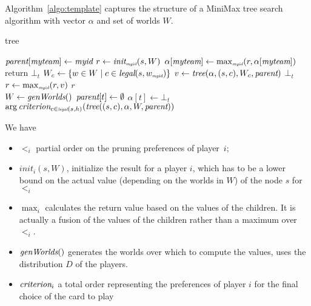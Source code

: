 \documentclass[runningheads]{llncs}
\begin{document}
Algorithm~\ref{algo:template} captures the structure of a MiniMax tree search algorithm with vector $\alpha$ and set of worlds $W$.  
%
\begin{algorithm}[t]
\caption{tree}
\label{algo:template}
\begin{algorithmic}

    \State $\mbox{\em parent}[\mbox{\em myteam}] \gets \mbox{\em myid}$
    \State $r \gets \mbox{\em init}_{\mbox{\em \tiny myid}}(s, W)$
        \State $\alpha[\mbox{\em myteam}] \gets \max_{\mbox{\em \tiny myid}}(r,\alpha[\mbox{\em myteam}])$
            \State $\text{return } \bot_{t}$
        \EndIf
        \State $W_c \gets \{ w \in W \mid c \in \mbox{\em legal}(s, w_{\mbox{\em \tiny myid}}) \}$
        \State $v \gets \mbox{\em tree}(\alpha, (s, c), W_c, \mbox{\em parent})$
                \State \Return $\bot_t$
            \EndIf
        \Else
            \State $r \gets \max_{\mbox{\em \tiny myid}}(r,v)$
        \EndIf
    \EndFor
    \State \Return $r$
\EndFunction
\\
    \State $W \gets \mbox{\em genWorlds}()$
        \State $\mbox{\em parent}[t] \gets \emptyset$
        \State $\alpha[t] \gets \bot_t$
    \EndFor
    \State \Return $\arg \mbox{\em criterion}_{c \in \mbox{\em \tiny legal}(s, h)} (\mbox{\em tree}((s,c), \alpha, W, \mbox{\em parent}))$
\EndFunction

\end{algorithmic}
\end{algorithm}
We have
\begin{itemize}
    \item $<_i$ partial order on the pruning preferences of player~$i$;
    \item $init_i(s,W)$, initialize the result for a player $i$, which has to be a lower bound on the actual value (depending on the worlds in $W$) of the node $s$ for $<_i$
    \item $\max_i$ calculates the return value based on the values of the children. It is actually a fusion of the values of the children rather than a maximum over $<_i$. %
    \item $\mbox{\em genWorlds}()$ generates the worlds over which to compute the values, uses the distribution $D$ of the players.
    \item $\mbox{\em criterion}_i$ a total order representing the preferences of player $i$ for the final choice of the card to play
\end{itemize}
\end{document}
